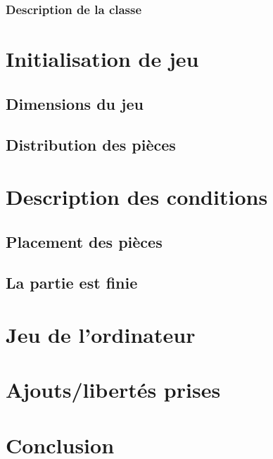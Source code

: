 \documentclass[a4paper, titlepage, french]{report}
\begin{document}
\subsection{Description de la classe}

\chapter{Initialisation de jeu}

\section{Dimensions du jeu}

\section{Distribution des pièces}

\chapter{Description des conditions}

\section{Placement des pièces}
\section{La partie est finie}

\chapter{Jeu de l'ordinateur}

\chapter{Ajouts/libertés prises}




\chapter{Conclusion}
\end{document}

